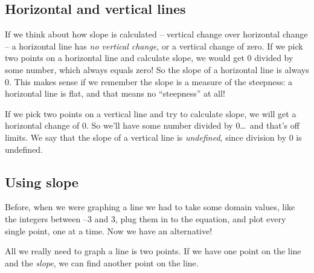 \subsection{Horizontal and vertical lines}

If we think about how slope is calculated -- vertical change over horizontal change -- a horizontal line has \textit{no vertical change}, or a vertical change of zero. If we pick two points on a horizontal line and calculate slope, we would get 0 divided by some number, which always equals zero! So the slope of a horizontal line is always 0. This makes sense if we remember the slope is a measure of the steepness: a horizontal line is flat, and that means no ``steepness'' at all!

If we pick two points on a vertical line and try to calculate slope, we will get a horizontal change of 0. So we'll have some number divided by 0\ldots\ and that's off limits. We say that the slope of a vertical line is \textit{undefined}, since division by 0 is undefined.

\subsection{Using slope}

Before, when we were graphing a line we had to take some domain values, like the integers between $–3$ and $3$, plug them in to the equation, and plot every single point, one at a time. Now we have an alternative!

All we really need to graph a line is two points. If we have one point on the line and the \textit{slope}, we can find another point on the line.

